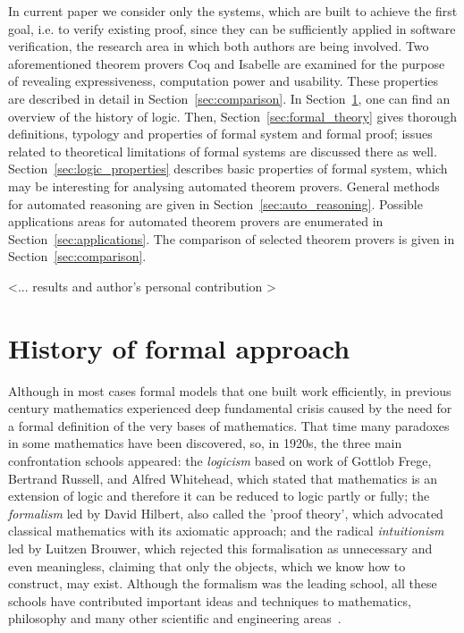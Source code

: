 \documentclass[article]{aaltoseries}
\begin{document}
In current paper we consider only the systems, which are built to achieve the first goal, i.e. to verify existing proof, since they can be sufficiently applied in software verification, the research area in which both authors are being involved. Two aforementioned theorem provers Coq and Isabelle are examined for the purpose of revealing expressiveness, computation power and usability. These properties are described in detail in Section~\ref{sec:comparison}. 
In Section~\ref{sec:formal_history}, one can find an overview of the history of logic. Then, Section~\ref{sec:formal_theory} gives thorough definitions, typology and properties of formal system and formal proof; issues related to theoretical limitations of formal systems are discussed there as well. Section~\ref{sec:logic_properties} describes basic properties of formal system, which may be interesting for analysing automated theorem provers. General methods for automated reasoning are given in Section~\ref{sec:auto_reasoning}. Possible applications areas for automated theorem provers are enumerated in Section~\ref{sec:applications}. The comparison of selected theorem provers is given in Section~\ref{sec:comparison}.

<... results and author's personal contribution >



\section{History of formal approach}
\label{sec:formal_history}

Although in most cases formal models that one built work efficiently, in previous century mathematics experienced deep fundamental crisis caused by the need for a formal definition of the very bases of mathematics. That time many paradoxes in some mathematics have been discovered, so, in 1920s, the three main confrontation schools appeared:
the \textit{logicism} based on work of Gottlob Frege, Bertrand Russell, and Alfred Whitehead, which stated that mathematics is an extension of logic and therefore it can be reduced to logic partly or fully;
the \textit{formalism} led by David Hilbert, also called the 'proof theory', which advocated classical mathematics with its axiomatic approach;
and the radical \textit{intuitionism} led by Luitzen Brouwer, which rejected this formalisation as unnecessary and even meaningless, claiming that only the objects, which we know how to construct, may exist.
Although the formalism was the leading school, all these schools have contributed important ideas and techniques to mathematics, philosophy and many other scientific and engineering areas~\cite{Fer08}.
\end{document}
